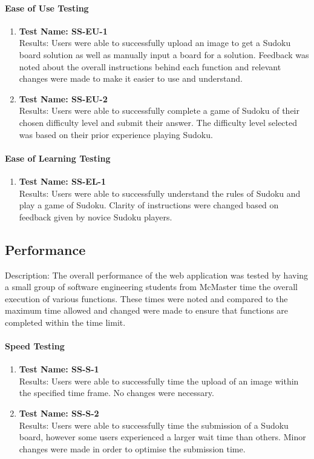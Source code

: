 \documentclass[11pt]{article}
\begin{document}
\paragraph{Ease of Use Testing}
\begin{enumerate}
    \item \textbf{Test Name: SS-EU-1}\\
    Results: Users were able to successfully upload an image to get a Sudoku board solution as well as manually input a board for a solution. Feedback was noted about the overall instructions behind each function and relevant changes were made to make it easier to use and understand.
    
    \item \textbf{Test Name: SS-EU-2}\\
    Results: Users were able to successfully complete a game of Sudoku of their chosen difficulty level and submit their answer. The difficulty level selected was based on their prior experience playing Sudoku.
\end{enumerate}

\paragraph{Ease of Learning Testing}
\begin{enumerate}
    \item \textbf{Test Name: SS-EL-1}\\
    Results: Users were able to successfully understand the rules of Sudoku and play a game of Sudoku. Clarity of instructions were changed based on feedback given by novice Sudoku players.
\end{enumerate}

\subsection{Performance}
Description: The overall performance of the web application was tested by having a small group of software engineering students from McMaster time the overall execution of various functions. These times were noted and compared to the maximum time allowed and changed were made to ensure that functions are completed within the time limit.

\paragraph{Speed Testing}
\begin{enumerate}
    \item \textbf{Test Name: SS-S-1}\\
    Results: Users were able to successfully time the upload of an image within the specified time frame. No changes were necessary.
    
    \item \textbf{Test Name: SS-S-2}\\
    Results: Users were able to successfully time the submission of a Sudoku board, however some users experienced a larger wait time than others. Minor changes were made in order to optimise the submission time.
\end{enumerate}
\end{document}
